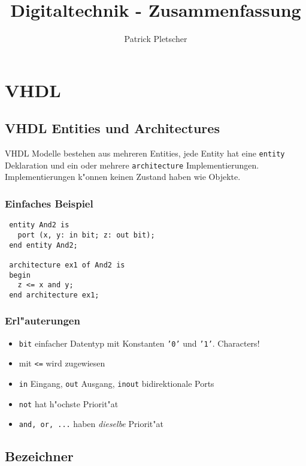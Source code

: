 \documentclass[german, 10pt, a4paper, twocolumn]{scrartcl}
\title{Digitaltechnik - Zusammenfassung}
\author{Patrick Pletscher}
\theoremstyle{definition}
\begin{document}
\maketitle

\section{VHDL}

\subsection{VHDL Entities und Architectures}

VHDL Modelle bestehen aus mehreren Entities, jede Entity hat eine \texttt{entity} Deklaration und ein oder mehrere \texttt{architecture} Implementierungen. Implementierungen k"onnen keinen Zustand haben wie Objekte.

\subsubsection{Einfaches Beispiel}

\begin{verbatim}
 entity And2 is
   port (x, y: in bit; z: out bit);
 end entity And2;

 architecture ex1 of And2 is
 begin
   z <= x and y;
 end architecture ex1; 
\end{verbatim}

\subsubsection{Erl"auterungen}

\begin{itemize}
	\item \texttt{bit} einfacher Datentyp mit Konstanten \texttt{'0'} und \texttt{'1'}. Characters!
	\item mit \texttt{<=} wird zugewiesen
	\item \texttt{in} Eingang, \texttt{out} Ausgang, \texttt{inout} bidirektionale Ports
	\item \texttt{not} hat h"ochste Priorit"at
	\item \texttt{and, or, ...} haben \textit{dieselbe} Priorit"at
\end{itemize}

\subsection{Bezeichner}
\end{document}
